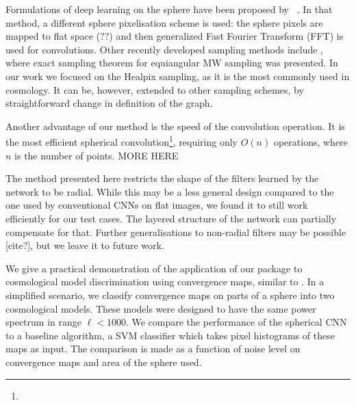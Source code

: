 \documentclass[final,twocolumn,3p,times,authoryear]{elsarticle}
\newcommand{\todo}[1]{{\color[rgb]{.6,.1,.6}{#1}}}
\newcommand{\1}{\b{1}}              %
\newcommand{\0}{\b{0}}              %
\begin{document}
Formulations of deep learning on the sphere have been proposed by ~\citet{cohen2017convolutional,cohen2018spherical}.
In that method, a different sphere pixelisation scheme is used: the sphere pixels are mapped to flat space (??) and then generalized Fast Fourier Transform (FFT) is used for convolutions.
Other recently developed sampling methods include \citep{mcewen2011novelsampling}, where exact sampling theorem for equiangular MW sampling was presented.
In our work we focused on the Healpix sampling, as it is the most commonly used in cosmology.
It can be, however, extended to other sampling schemes, by straightforward change in definition of the graph.

Another advantage of our method is the speed of the convolution operation.
It is the most efficient spherical convolution\footnote{\todo{provably? cannot be faster than O(n) without approximations, e.g. sketching}}, requiring only $O(n)$ operations, where $n$ is the number of points.
MORE HERE

The method presented here restricts the shape of the filters learned by the network to be radial.
While this may be a less general design compared to the one used by conventional CNNs on flat images, we found it to still work efficiently for our test cases.
The layered structure of the network can partially compensate for that.
Further generalisations to non-radial filters may be possible [cite?], but we leave it to future work.

We give a practical demonstration of the application of our package to cosmological model discrimination using convergence maps, similar to \citep{schmelze2017cosmologicalmodel}.
In a simplified scenario, we classify convergence maps on parts of a sphere into two cosmological models.
These models were designed to have the same power spectrum in range $\ell < 1000$.
We compare the performance of the spherical CNN to a baseline algorithm, a SVM classifier which takes pixel histograms of these maps as input.
The comparison is made as a function of noise level on convergence maps and area of the sphere used.
\end{document}

